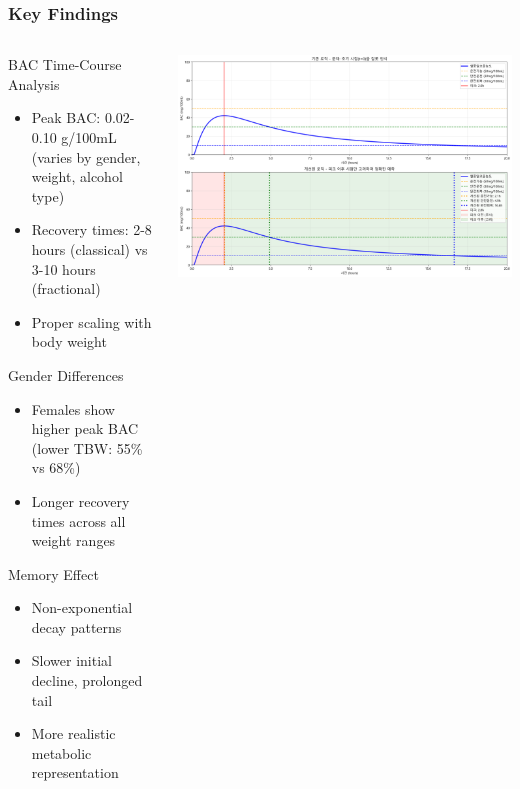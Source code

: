 \documentclass{beamer}
\begin{document}
\begin{frame}
\frametitle{Key Findings}
\begin{columns}
\begin{column}{0.5\textwidth}
\begin{block}{BAC Time-Course Analysis}
\begin{itemize}
    \item Peak BAC: 0.02-0.10 g/100mL (varies by gender, weight, alcohol type)
    \item Recovery times: 2-8 hours (classical) vs 3-10 hours (fractional)
    \item Proper scaling with body weight
\end{itemize}
\end{block}

\begin{block}{Gender Differences}
\begin{itemize}
    \item Females show higher peak BAC (lower TBW: 55\% vs 68\%)
    \item Longer recovery times across all weight ranges
\end{itemize}
\end{block}

\begin{block}{Memory Effect}
\begin{itemize}
    \item Non-exponential decay patterns
    \item Slower initial decline, prolonged tail
    \item More realistic metabolic representation
\end{itemize}
\end{block}
\end{column}

\begin{column}{0.5\textwidth}
\begin{center}
\includegraphics[width=\textwidth]{recovery_time_comparison.png}
\caption*{Recovery time vs. body weight by gender}
\end{center}
\end{column}
\end{columns}
\end{frame}
\end{document}
